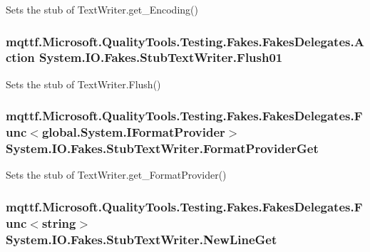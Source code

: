 Sets the stub of Text\-Writer.\-get\-\_\-\-Encoding()

\hypertarget{class_system_1_1_i_o_1_1_fakes_1_1_stub_text_writer_a88aa3d7d90d6fb2ee6ccd8237cd609e5}{
\subsubsection[{Flush01}]{\setlength{\rightskip}{0pt plus 5cm}mqttf.\-Microsoft.\-Quality\-Tools.\-Testing.\-Fakes.\-Fakes\-Delegates.\-Action System.\-I\-O.\-Fakes.\-Stub\-Text\-Writer.\-Flush01}}\label{class_system_1_1_i_o_1_1_fakes_1_1_stub_text_writer_a88aa3d7d90d6fb2ee6ccd8237cd609e5}


Sets the stub of Text\-Writer.\-Flush()

\hypertarget{class_system_1_1_i_o_1_1_fakes_1_1_stub_text_writer_ac9eadc1380c6f3e16abf656e00937f61}{
\subsubsection[{Format\-Provider\-Get}]{\setlength{\rightskip}{0pt plus 5cm}mqttf.\-Microsoft.\-Quality\-Tools.\-Testing.\-Fakes.\-Fakes\-Delegates.\-Func$<$global.\-System.\-I\-Format\-Provider$>$ System.\-I\-O.\-Fakes.\-Stub\-Text\-Writer.\-Format\-Provider\-Get}}\label{class_system_1_1_i_o_1_1_fakes_1_1_stub_text_writer_ac9eadc1380c6f3e16abf656e00937f61}


Sets the stub of Text\-Writer.\-get\-\_\-\-Format\-Provider()

\hypertarget{class_system_1_1_i_o_1_1_fakes_1_1_stub_text_writer_a9f4cae58e7033794acb16e4dd1cf9656}{
\subsubsection[{New\-Line\-Get}]{\setlength{\rightskip}{0pt plus 5cm}mqttf.\-Microsoft.\-Quality\-Tools.\-Testing.\-Fakes.\-Fakes\-Delegates.\-Func$<$string$>$ System.\-I\-O.\-Fakes.\-Stub\-Text\-Writer.\-New\-Line\-Get}}\label{class_system_1_1_i_o_1_1_fakes_1_1_stub_text_writer_a9f4cae58e7033794acb16e4dd1cf9656}



